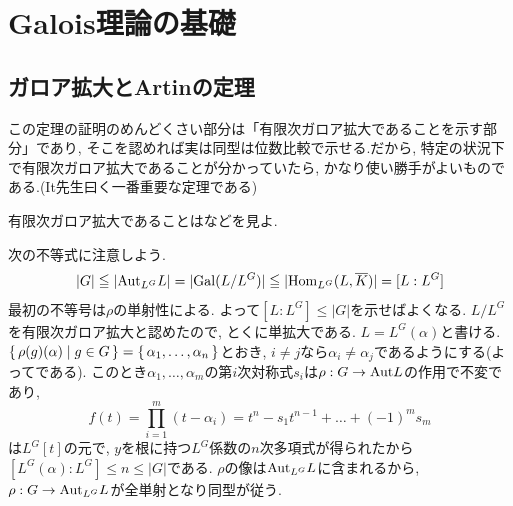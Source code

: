 \section{Galois理論の基礎}
\subsection{ガロア拡大とArtinの定理}

\begin{point}
この定理の証明のめんどくさい部分は「有限次ガロア拡大であることを示す部分」であり, そこを認めれば実は同型は位数比較で示せる.だから, 特定の状況下で有限次ガロア拡大であることが分かっていたら, かなり使い勝手がよいものである.(It先生曰く一番重要な定理である)
\end{point}
\prf {} 有限次ガロア拡大であることは\cite{aoyukie}などを見よ. \par
次の不等式に注意しよう.
\[|G| \leqq |\mathrm{Aut}_{L^G}L| = |\mathrm{Gal}(L/L^G)| \leqq |\mathrm{Hom}_{L^G}(L,\overline{K})| = [L:L^G]  \]
最初の不等号は$\rho$の単射性による. よって$[L:L^G] \leq |G|$を示せばよくなる. $L/L^G$を有限次ガロア拡大と認めたので, とくに単拡大である. $L=L^G(\alpha)$と書ける.  $\set{\rho(g)(\alpha) \mid g\in G } = \set{\alpha_1,\dots, \alpha_n}$とおき, $i\neq j$なら$\alpha_i\neq \alpha_j$であるようにする(よってである). このとき$\alpha_1,\dots,\alpha_m$の第$i$次対称式$s_i$は$\rho:G\to \mathrm{Aut}L$の作用で不変であり,
\[f(t) = \prod_{i=1}^{m} (t-\alpha_i) = t^n - s_1t^{n-1} + \dots + (-1)^{m} s_m\]
は$L^G[t]$の元で, $y$を根に持つ$L^G$係数の$n$次多項式が得られたから$[L^G(\alpha):L^G] \leq n\leq |G|$である.  $\rho$の像は$\mathrm{Aut}_{L^G}L$に含まれるから, $\rho:G\to \mathrm{Aut}_{L^G}L$が全単射となり同型が従う.


